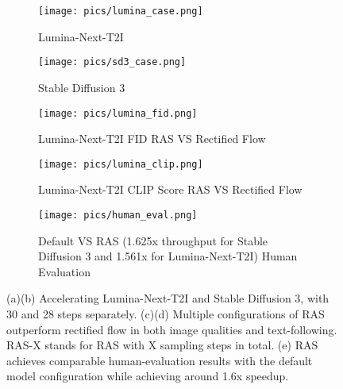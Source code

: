 \begin{figure*}[htbp]
    \centering
    \begin{minipage}{0.58\textwidth}
        \begin{subfigure}{\linewidth}
            \texttt{[image: pics/lumina\_case.png]}
            \caption{Lumina-Next-T2I ~~~~~~~~~~~~~~~~~~~~~~}
        \end{subfigure}
        \vfill
        \begin{subfigure}{\linewidth}
            \texttt{[image: pics/sd3\_case.png]}
            \caption{Stable Diffusion 3 ~~~~~~~~~~~~~~~~~~~~~~}
        \end{subfigure}
    \end{minipage}
    \hspace{0.01\textwidth}
    \begin{minipage}{0.35\textwidth}
        \begin{subfigure}{\linewidth}
            \texttt{[image: pics/lumina\_fid.png]}
            \caption{Lumina-Next-T2I FID RAS VS Rectified Flow}
        \end{subfigure}
        \vfill
        \begin{subfigure}{\linewidth}
            \texttt{[image: pics/lumina\_clip.png]}
            \caption{Lumina-Next-T2I CLIP Score RAS VS Rectified Flow}
        \end{subfigure}
        \vfill
        \begin{subfigure}{\linewidth}
            \texttt{[image: pics/human\_eval.png]}
            \caption{Default VS RAS (1.625x throughput for Stable Diffusion 3 and 1.561x for Lumina-Next-T2I) Human Evaluation}
        \end{subfigure}
    \end{minipage}

    \caption{(a)(b) Accelerating Lumina-Next-T2I and Stable Diffusion 3, with 30 and 28 steps separately. (c)(d) Multiple configurations of RAS outperform rectified flow in both image qualities and text-following. RAS-X stands for RAS with X sampling steps in total. (e) RAS achieves comparable human-evaluation results with the default model configuration while achieving around 1.6x speedup.}
    \label{fig:teaser}
\end{figure*}

